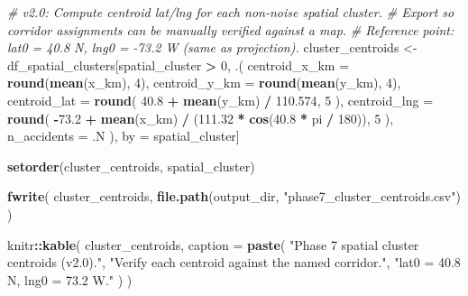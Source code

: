 \documentclass[
]{article}
\newenvironment{Shaded}{\begin{snugshade}}{\end{snugshade}}
\newcommand{\AttributeTok}[1]{\textcolor[rgb]{0.13,0.29,0.53}{#1}}
\newcommand{\CommentTok}[1]{\textcolor[rgb]{0.56,0.35,0.01}{\textit{#1}}}
\newcommand{\DecValTok}[1]{\textcolor[rgb]{0.00,0.00,0.81}{#1}}
\newcommand{\FloatTok}[1]{\textcolor[rgb]{0.00,0.00,0.81}{#1}}
\newcommand{\FunctionTok}[1]{\textcolor[rgb]{0.13,0.29,0.53}{\textbf{#1}}}
\newcommand{\NormalTok}[1]{#1}
\newcommand{\OtherTok}[1]{\textcolor[rgb]{0.56,0.35,0.01}{#1}}
\newcommand{\SpecialCharTok}[1]{\textcolor[rgb]{0.81,0.36,0.00}{\textbf{#1}}}
\newcommand{\StringTok}[1]{\textcolor[rgb]{0.31,0.60,0.02}{#1}}
\begin{document}
\begin{Shaded}
\begin{Highlighting}[]
\CommentTok{\# v2.0: Compute centroid lat/lng for each non{-}noise spatial cluster.}
\CommentTok{\# Export so corridor assignments can be manually verified against a map.}
\CommentTok{\# Reference point: lat0 = 40.8 N, lng0 = {-}73.2 W (same as projection).}
\NormalTok{cluster\_centroids }\OtherTok{\textless{}{-}}\NormalTok{ df\_spatial\_clusters[spatial\_cluster }\SpecialCharTok{\textgreater{}} \DecValTok{0}\NormalTok{, .(}
  \AttributeTok{centroid\_x\_km =} \FunctionTok{round}\NormalTok{(}\FunctionTok{mean}\NormalTok{(x\_km), }\DecValTok{4}\NormalTok{),}
  \AttributeTok{centroid\_y\_km =} \FunctionTok{round}\NormalTok{(}\FunctionTok{mean}\NormalTok{(y\_km), }\DecValTok{4}\NormalTok{),}
  \AttributeTok{centroid\_lat  =} \FunctionTok{round}\NormalTok{(}
    \FloatTok{40.8} \SpecialCharTok{+} \FunctionTok{mean}\NormalTok{(y\_km) }\SpecialCharTok{/} \FloatTok{110.574}\NormalTok{, }\DecValTok{5}
\NormalTok{  ),}
  \AttributeTok{centroid\_lng  =} \FunctionTok{round}\NormalTok{(}
    \SpecialCharTok{{-}}\FloatTok{73.2} \SpecialCharTok{+} \FunctionTok{mean}\NormalTok{(x\_km) }\SpecialCharTok{/}\NormalTok{ (}\FloatTok{111.32} \SpecialCharTok{*} \FunctionTok{cos}\NormalTok{(}\FloatTok{40.8} \SpecialCharTok{*}\NormalTok{ pi }\SpecialCharTok{/} \DecValTok{180}\NormalTok{)), }\DecValTok{5}
\NormalTok{  ),}
  \AttributeTok{n\_accidents =}\NormalTok{ .N}
\NormalTok{), by }\OtherTok{=}\NormalTok{ spatial\_cluster]}

\FunctionTok{setorder}\NormalTok{(cluster\_centroids, spatial\_cluster)}

\FunctionTok{fwrite}\NormalTok{(}
\NormalTok{  cluster\_centroids,}
  \FunctionTok{file.path}\NormalTok{(output\_dir, }\StringTok{"phase7\_cluster\_centroids.csv"}\NormalTok{)}
\NormalTok{)}

\NormalTok{knitr}\SpecialCharTok{::}\FunctionTok{kable}\NormalTok{(}
\NormalTok{  cluster\_centroids,}
  \AttributeTok{caption =} \FunctionTok{paste}\NormalTok{(}
    \StringTok{"Phase 7 spatial cluster centroids (v2.0)."}\NormalTok{,}
    \StringTok{"Verify each centroid against the named corridor."}\NormalTok{,}
    \StringTok{"lat0 = 40.8 N, lng0 = 73.2 W."}
\NormalTok{  )}
\NormalTok{)}
\end{Highlighting}
\end{Shaded}
\end{document}
